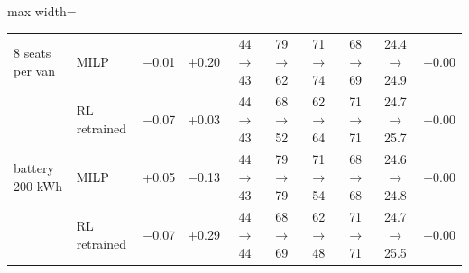 \begin{table}[H]
\begin{adjustbox}{max width=\textwidth}
\begin{tabular}{llrrcccccr}
8 seats per van & MILP & $-$0.01 & +0.20 & 44$\to$43 & 79$\to$62 & 71$\to$74 & 68$\to$69 & 24.4$\to$24.9 & +0.00 \\
 & RL retrained & $-$0.07 & +0.03 & 44$\to$43 & 68$\to$52 & 62$\to$64 & 71$\to$71 & 24.7$\to$25.7 & $-$0.00 \\
battery 200 kWh & MILP & +0.05 & $-$0.13 & 44$\to$43 & 79$\to$79 & 71$\to$54 & 68$\to$68 & 24.6$\to$24.8 & $-$0.00 \\
 & RL retrained & $-$0.07 & +0.29 & 44$\to$44 & 68$\to$69 & 62$\to$48 & 71$\to$71 & 24.7$\to$25.5 & +0.00 \\
\bottomrule\end{tabular}\end{adjustbox}\end{table}
